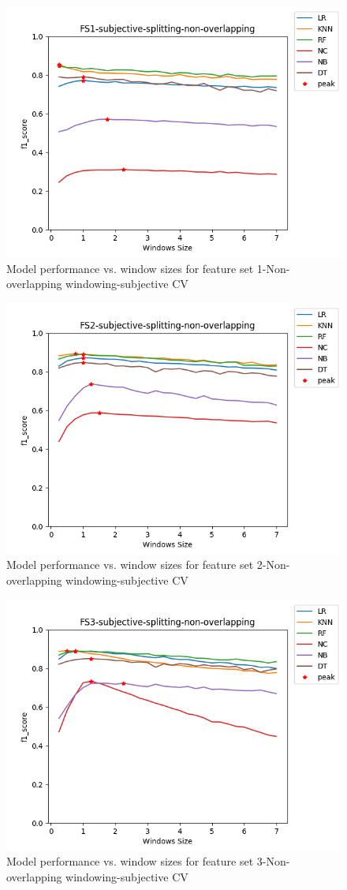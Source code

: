 
\begin{figure}[h]
    \centering
    \includegraphics[width=.5\textwidth]{Figures/FS1-subjective-splitting-non-overlapping.png}
    \caption{Model performance vs. window sizes for feature set 1-Non-overlapping windowing-subjective CV}
    \label{fig:sbj-nonover-fs1}
\end{figure}

\begin{figure}[h]
    \centering
    \includegraphics[width=.5\textwidth]{Figures/FS2-subjective-splitting-non-overlapping.png}
    \caption{Model performance vs. window sizes for feature set 2-Non-overlapping windowing-subjective CV}
    \label{fig:sbj-nonover-fs2}
\end{figure}

\begin{figure}[h]
    \centering
    \includegraphics[width=.5\textwidth]{Figures/FS3-subjective-splitting-non-overlapping.png}
    \caption{Model performance vs. window sizes for feature set 3-Non-overlapping windowing-subjective CV}
    \label{fig:sbj-nonover-fs3}
\end{figure}

